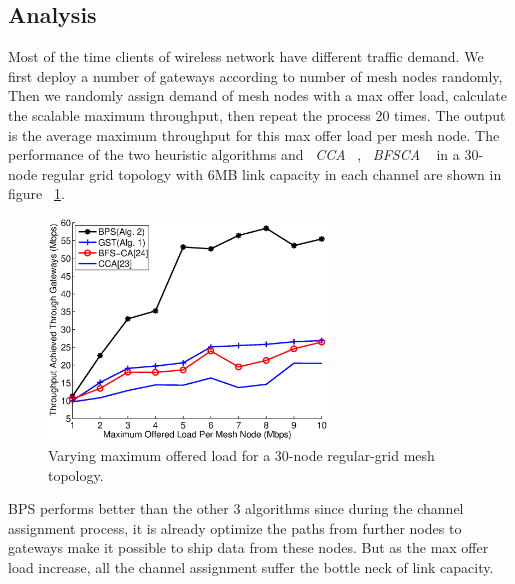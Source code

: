 
\subsection{Analysis}
\label{subsec:analysis}
Most of the time clients of wireless network have different traffic demand. 
We first deploy a number of gateways according to number of mesh nodes randomly, 
   Then we randomly assign demand of mesh nodes with a max offer load,
   calculate the scalable maximum throughput, then repeat the process 20 times.
   The output is the average maximum throughput for this max offer load per mesh node.
   The performance of the two heuristic algorithms and ~\emph{CCA} ~\cite{draves2004routing}, ~\emph{BFSCA}  ~\cite{ramachandran2006interference} in a 30-node regular grid topology with 6MB link capacity in each channel are shown in figure ~\ref{fig:maxtpt}.

   \begin{figure}
   \centering
   \includegraphics[width=74mm]{figures/maxtpt}
   \vspace{-0.1in}
   \caption{Varying maximum offered load for a 30-node regular-grid mesh topology.}                                                                               
   \label{fig:maxtpt}
   \end{figure}
   BPS performs better than the other 3 algorithms since during the channel assignment process, it is already optimize the paths from further nodes to gateways make it possible to ship data from these nodes. But as the max offer load increase, all the channel assignment suffer the bottle neck of link capacity.




